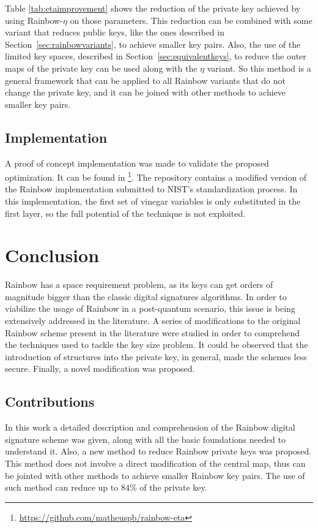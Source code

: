 \documentclass{ufsctex/ufsctex}
\begin{document}
Table \ref{tab:etaimprovement} shows the reduction of the private key achieved
by using Rainbow-$\eta$ on those parameters. This reduction can be combined
with some variant that reduces public keys, like the ones described in
Section~\ref{sec:rainbowvariants}, to achieve smaller key pairs. Also, the use
of the limited key spaces, described in Section~\ref{sec:equivalentkeys}, to
reduce the outer maps of the private key can be used along with the $\eta$
variant. So this method is a general framework that can be applied to all
Rainbow variants that do not change the private key, and it can be joined with
other methods to achieve smaller key pairs.

\section{Implementation}

A proof of concept implementation was made to validate the proposed
optimization. It can be found in
\footnote{\url{https://github.com/matheuspb/rainbow-eta}}. The repository
contains a modified version of the Rainbow implementation submitted to NIST's
standardization process. In this implementation, the first set of vinegar
variables is only substituted in the first layer, so the full potential of the
technique is not exploited.

\chapter{Conclusion}

Rainbow has a space requirement problem, as its keys can get orders of
magnitude bigger than the classic digital signatures algorithms. In order to
viabilize the usage of Rainbow in a post-quantum scenario, this issue is being
extensively addressed in the literature. A series of modifications to the
original Rainbow scheme present in the literature were studied in order to
comprehend the techniques used to tackle the key size problem. It could be
observed that the introduction of structures into the private key, in general,
made the schemes less secure. Finally, a novel modification was proposed.

\section{Contributions}

In this work a detailed description and comprehension of the Rainbow digital
signature scheme was given, along with all the basic foundations needed to
understand it. Also, a new method to reduce Rainbow private keys was proposed.
This method does not involve a direct modification of the central map, thus can
be jointed with other methods to achieve smaller Rainbow key pairs. The use of
such method can reduce up to 84\% of the private key.
\end{document}
